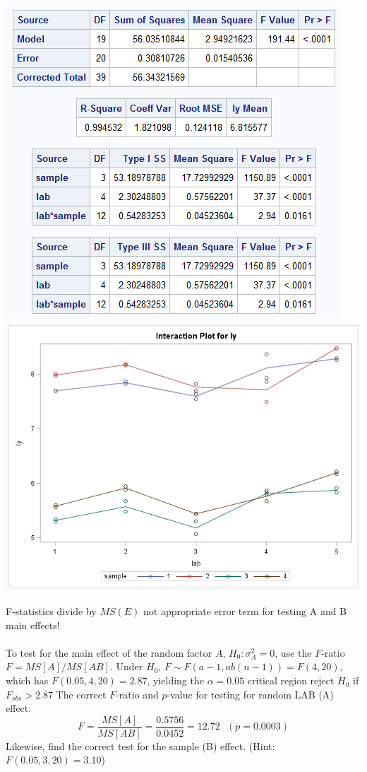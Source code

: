 \begin{center}
\includegraphics[scale=0.7]{MilkGLM}\includegraphics[scale=0.5]{MilkGLM2}
\end{center}

F-statistics divide by $MS(E)$ not appropriate error term for testing A and B main effects! \\~\\

To test for the main effect of the random factor $A$, $H_0: \sigma_A^2=0$, use the $F$-ratio $F=MS[A]/MS[AB]$.  Under $H_0$,
$F \sim F(a-1,ab(n-1))=F(4,20)$, which has $F(0.05,4,20)=2.87$, yielding the $\alpha=0.05$ critical region reject $H_0$ if $F_{obs}>2.87$
The correct $F$-ratio and $p$-value for testing for random LAB (A) effect: 
$$ F=\frac{MS[A]}{MS[AB]} = \frac{0.5756}{0.0452}=12.72~~~(p=0.0003) $$
Likewise, find the correct test for the sample (B) effect. (Hint: $F(0.05,3,20)=3.10$)\\~\\~\\~\\~\\~\\

